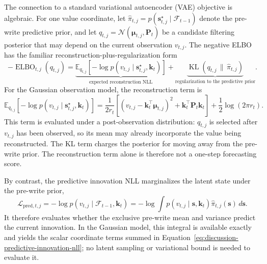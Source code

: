 \documentclass[11pt]{article}
\newcommand{\vct}[1]{\boldsymbol{#1}}
\begin{document}
The connection to a standard variational autoencoder (VAE) objective is algebraic. For one value
coordinate, let
$\widehat\pi_{t,j}=p(\vct{s}_{t,j}^{\star}\mid\mathcal{F}_{t-1})$ denote the pre-write predictive
prior, and let $q_{t,j}=\mathcal{N}(\vct{\mu}_{t,j},\vct{P}_t)$ be a candidate filtering posterior
that may depend on the current observation $v_{t,j}$. The negative ELBO has the familiar
reconstruction-plus-regularization form
\begin{equation}
  -\operatorname{ELBO}_{t,j}(q_{t,j})
  =
  \underbrace{
    \mathbb{E}_{q_{t,j}}\!\left[
      -\log p(v_{t,j}\mid\vct{s}_{t,j}^{\star},\vct{k}_t)
    \right]
  }_{\text{expected reconstruction NLL}}
  +
  \underbrace{
    \operatorname{KL}\!\left(q_{t,j}\,\|\,\widehat\pi_{t,j}\right)
  }_{\text{regularization to the predictive prior}}.
  \label{eq:discussion-negative-elbo-decomposition}
\end{equation}
For the Gaussian observation model, the reconstruction term is
\begin{equation}
  \mathbb{E}_{q_{t,j}}\!\left[
    -\log p(v_{t,j}\mid\vct{s}_{t,j}^{\star},\vct{k}_t)
  \right]
  =\frac{1}{2r_t}\left[
    \left(v_{t,j}-\vct{k}_t^\top\vct{\mu}_{t,j}\right)^2
    +\vct{k}_t^\top\vct{P}_t\vct{k}_t
  \right]
  +\frac12\log(2\pi r_t).
  \label{eq:discussion-expected-versus-predictive-nll}
\end{equation}
This term is evaluated under a post-observation distribution: $q_{t,j}$ is selected after
$v_{t,j}$ has been observed, so its mean may already incorporate the value being reconstructed.
The KL term charges the posterior for moving away from the pre-write prior. The reconstruction
term alone is therefore not a one-step forecasting score.

By contrast, the predictive innovation NLL marginalizes the latent state under the pre-write
prior,
\begin{equation}
  \mathcal{L}_{\mathrm{pred},t,j}
  =-\log p(v_{t,j}\mid\mathcal{F}_{t-1},\vct{k}_t)
  =-\log\!\int
    p(v_{t,j}\mid\vct{s},\vct{k}_t)
    \widehat\pi_{t,j}(\vct{s})\,d\vct{s}.
  \label{eq:discussion-predictive-nll-marginal}
\end{equation}
It therefore evaluates whether the exclusive pre-write mean and variance predict the current
innovation. In the Gaussian model, this integral is available exactly and yields the scalar
coordinate terms summed in Equation~\eqref{eq:discussion-predictive-innovation-nll}; no latent
sampling or variational bound is needed to evaluate it.
\end{document}
